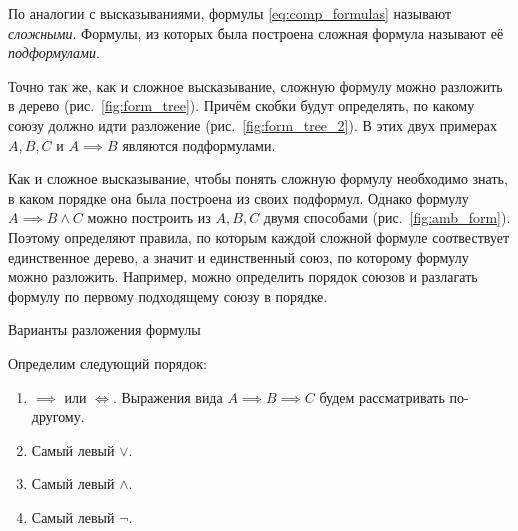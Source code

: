 По аналогии с высказываниями, формулы \eqref{eq:comp_formulas}
называют {\it сложными}.
Формулы, из которых была построена сложная формула
называют её {\it подформулами}.

Точно так же, как и сложное высказывание, сложную формулу можно
разложить в дерево (рис.~\ref{fig:form_tree}). Причём скобки будут
определять, по какому союзу должно идти разложение (рис.~\ref{fig:form_tree_2}).
В этих двух примерах $A,B,C$ и $A\implies B$ являются подформулами.

Как и сложное высказывание, чтобы понять сложную формулу
необходимо знать, в каком порядке она была построена из своих подформул.
Однако формулу $A\implies B\land C$ можно построить из $A,B,C$ двумя
способами (рис.~\ref{fig:amb_form}).
Поэтому определяют правила, по которым каждой сложной формуле
соотвествует единственное дерево, а значит и единственный союз,
по которому формулу можно разложить.
Например, можно определить порядок союзов и разлагать формулу по первому
подходящему союзу в порядке.

\begin{marginfigure}[-2cm]
  \begin{multicols}{2}

  \end{multicols}

  \caption{Варианты разложения формулы}\label{fig:amb_form}
\end{marginfigure}

Определим следующий порядок:
\begin{enumerate}
  \item{}$\implies$ или $\iff$. Выражения вида ${A\implies B\implies C}$
  будем рассматривать по-другому.
  \item{}Самый левый $\lor$.
  \item{}Самый левый $\land$.
  \item{}Самый левый $\lnot$.
\end{enumerate}

